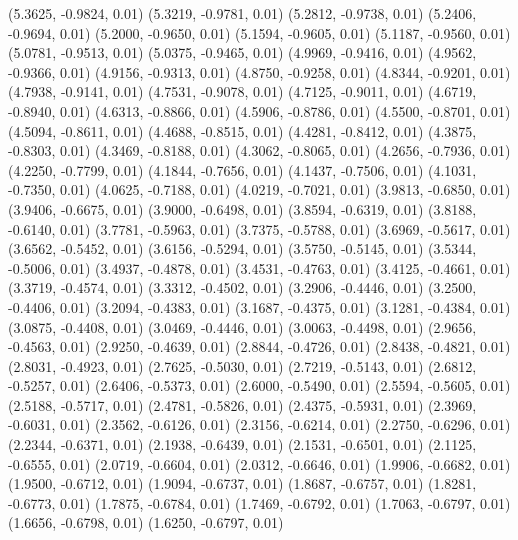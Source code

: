 {    (5.3625, -0.9824, 0.01)
    (5.3219, -0.9781, 0.01)
    (5.2812, -0.9738, 0.01)
    (5.2406, -0.9694, 0.01)
    (5.2000, -0.9650, 0.01)
    (5.1594, -0.9605, 0.01)
    (5.1187, -0.9560, 0.01)
    (5.0781, -0.9513, 0.01)
    (5.0375, -0.9465, 0.01)
    (4.9969, -0.9416, 0.01)
    (4.9562, -0.9366, 0.01)
    (4.9156, -0.9313, 0.01)
    (4.8750, -0.9258, 0.01)
    (4.8344, -0.9201, 0.01)
    (4.7938, -0.9141, 0.01)
    (4.7531, -0.9078, 0.01)
    (4.7125, -0.9011, 0.01)
    (4.6719, -0.8940, 0.01)
    (4.6313, -0.8866, 0.01)
    (4.5906, -0.8786, 0.01)
    (4.5500, -0.8701, 0.01)
    (4.5094, -0.8611, 0.01)
    (4.4688, -0.8515, 0.01)
    (4.4281, -0.8412, 0.01)
    (4.3875, -0.8303, 0.01)
    (4.3469, -0.8188, 0.01)
    (4.3062, -0.8065, 0.01)
    (4.2656, -0.7936, 0.01)
    (4.2250, -0.7799, 0.01)
    (4.1844, -0.7656, 0.01)
    (4.1437, -0.7506, 0.01)
    (4.1031, -0.7350, 0.01)
    (4.0625, -0.7188, 0.01)
    (4.0219, -0.7021, 0.01)
    (3.9813, -0.6850, 0.01)
    (3.9406, -0.6675, 0.01)
    (3.9000, -0.6498, 0.01)
    (3.8594, -0.6319, 0.01)
    (3.8188, -0.6140, 0.01)
    (3.7781, -0.5963, 0.01)
    (3.7375, -0.5788, 0.01)
    (3.6969, -0.5617, 0.01)
    (3.6562, -0.5452, 0.01)
    (3.6156, -0.5294, 0.01)
    (3.5750, -0.5145, 0.01)
    (3.5344, -0.5006, 0.01)
    (3.4937, -0.4878, 0.01)
    (3.4531, -0.4763, 0.01)
    (3.4125, -0.4661, 0.01)
    (3.3719, -0.4574, 0.01)
    (3.3312, -0.4502, 0.01)
    (3.2906, -0.4446, 0.01)
    (3.2500, -0.4406, 0.01)
    (3.2094, -0.4383, 0.01)
    (3.1687, -0.4375, 0.01)
    (3.1281, -0.4384, 0.01)
    (3.0875, -0.4408, 0.01)
    (3.0469, -0.4446, 0.01)
    (3.0063, -0.4498, 0.01)
    (2.9656, -0.4563, 0.01)
    (2.9250, -0.4639, 0.01)
    (2.8844, -0.4726, 0.01)
    (2.8438, -0.4821, 0.01)
    (2.8031, -0.4923, 0.01)
    (2.7625, -0.5030, 0.01)
    (2.7219, -0.5143, 0.01)
    (2.6812, -0.5257, 0.01)
    (2.6406, -0.5373, 0.01)
    (2.6000, -0.5490, 0.01)
    (2.5594, -0.5605, 0.01)
    (2.5188, -0.5717, 0.01)
    (2.4781, -0.5826, 0.01)
    (2.4375, -0.5931, 0.01)
    (2.3969, -0.6031, 0.01)
    (2.3562, -0.6126, 0.01)
    (2.3156, -0.6214, 0.01)
    (2.2750, -0.6296, 0.01)
    (2.2344, -0.6371, 0.01)
    (2.1938, -0.6439, 0.01)
    (2.1531, -0.6501, 0.01)
    (2.1125, -0.6555, 0.01)
    (2.0719, -0.6604, 0.01)
    (2.0312, -0.6646, 0.01)
    (1.9906, -0.6682, 0.01)
    (1.9500, -0.6712, 0.01)
    (1.9094, -0.6737, 0.01)
    (1.8687, -0.6757, 0.01)
    (1.8281, -0.6773, 0.01)
    (1.7875, -0.6784, 0.01)
    (1.7469, -0.6792, 0.01)
    (1.7063, -0.6797, 0.01)
    (1.6656, -0.6798, 0.01)
    (1.6250, -0.6797, 0.01)
}

